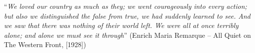 \begin{epigrafe}
    \vspace*{\fill}
{%
    \noindent\hspace{.5\textwidth}
    {\begin{minipage}{.5\textwidth}
            ``\textit{We loved our country as much as they; we went courageously into every action; but also we distinguished the false from true, 
            we had suddenly learned to see. And we saw that there was nothing of their world left. We were all at once terribly alone; and alone we 
            must see it through}'' (Enrich Maria Remarque -- All Quiet on The Western Front, [1928])
    \end{minipage}}%
    \vspace*{3cm}
}%
\end{epigrafe}
